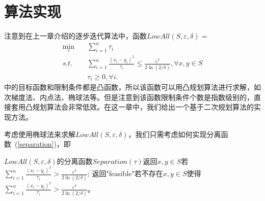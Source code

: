 \chapter{算法实现}
注意到在上一章介绍的逐步迭代算法中，函数$LowAll(S, \varepsilon, \delta)=$
\begin{align}
   \tag{lowall}    \min_{\tau} \quad & \sum_{i=1}^n \tau_i\\
        s.t.\quad & \sum_{i=1}^n \frac{(x_i -y_i)^2}{\tau_i} \le \frac{\varepsilon^2}{2 \ln(2/\delta)}, \forall x, y \in S\\
         &\tau_i\ge 0, \forall i.
\end{align}
中的目标函数和限制条件都是凸函数，所以该函数可以用凸规划算法进行求解，如次梯度法、内点法、椭球法等\cite{}。但是注意到该函数限制条件个数是指数级别的，直接套用凸规划算法会非常低效。在这一章中，我们给出一个基于二次规划算法的实现方法。

考虑使用椭球法来求解$LowAll(S, \varepsilon, \delta)$，我们只需考虑如何实现分离函数~(\ref{separation})，即
\begin{definition}
$LowAll(S, \varepsilon, \delta)$的分离函数$Separation(\tau)$返回$x,y\in S$若$\sum_{i=1}^n \frac{(x_i -y_i)^2}{\tau_i} > \frac{\varepsilon^2}{2 \ln(2/\delta)}$; 返回"feasible"若不存在$x,y\in S$使得$\sum_{i=1}^n \frac{(x_i -y_i)^2}{\tau_i} > \frac{\varepsilon^2}{2 \ln(2/\delta)}$。
\end{definition}


